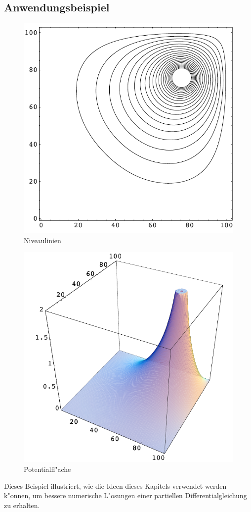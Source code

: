 \subsection{Anwendungsbeispiel}
\begin{figure}
\begin{center}
\includegraphics[width=0.8\hsize]{graphics/neilcontour}
\end{center}
\caption{Niveaulinien\label{neilcontour}}
\end{figure}
\begin{figure}
\begin{center}
\includegraphics[width=0.8\hsize]{graphics/neilloesung}
\end{center}
\caption{Potentialfl"ache\label{neilloesung}}
\end{figure}
Dieses Beispiel illustriert, wie die Ideen dieses Kapitels verwendet werden k"onnen,
um bessere numerische L"osungen einer partiellen Differentialgleichung
zu erhalten.

